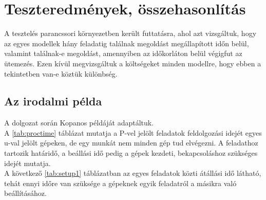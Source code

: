 \documentclass {report}
\begin{document}
\chapter{Teszteredmények, összehasonlítás}
A tesztelés parancssori környezetben került futtatásra, ahol azt vizsgáltuk, hogy az egyes modellek hány feladatig találnak megoldást megállapított időn belül, valamint találnak-e megoldást, amennyiben az időkorláton belül végigfut az ütemezés. Ezen kívül megvizsgáltuk a költségeket minden modellre, hogy ebben a tekintetben van-e köztük különbség. 
\section{Az irodalmi példa}
A dolgozat során Kopanos\cite{Kopanos2009} példáját adaptáltuk.\\
A \ref{tab:proctime} táblázat mutatja a P-vel jelölt feladatok feldolgozási idejét egyes u-val jelölt gépeken, de egy munkát nem minden gép tud elvégezni. A feladathoz tartozik határidő, a beállási idő pedig a gépek kezdeti, bekapcsoláshoz szükséges idejét mutatja.\\
A következő \ref{tab:setup1} táblázatban az egyes feladatok közti átállási idő látható, tehát ennyi időre van szüksége a gépeknek egyik feladatról a másikra való beállításához.
\end{document}
